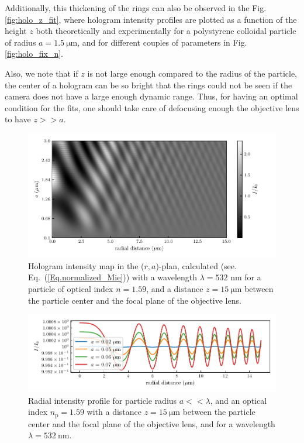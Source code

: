 Additionally, this thickening of the rings can also be observed in the Fig.\ref{fig:holo_z_fit}, where hologram intensity profiles are plotted as a function of the height $z$ both theoretically and experimentally for a polystyrene colloidal particle of radius  $a = 1.5 ~ \mathrm{\mu m} $, and for different couples of parameters in Fig.\ref{fig:holo_fix_n}.

Also, we note that if $z$ is not large enough compared to the radius of the particle, the center of a hologram can be so bright that the rings could not be seen if the camera does not have a large enough dynamic range.  Thus, for having an optimal condition for the fits, one should take care of defocusing enough the objective lens to have $z >> a$.





\begin{figure}
	\centering
	\includegraphics{02_body/chapter2/images/holo_size_exemple/holos_only_r.pdf}
	\caption{Hologram intensity map in the ($r,a$)-plan, calculated (see. Eq.~(\ref{Eq.normalized_Mie})) with a wavelength $\lambda = 532$ nm for a particle of optical index $n = 1.59$, and a distance $z = 15 ~\mathrm{\mu m}$ between the particle center and the focal plane of the objective lens.~\href{https://github.com/eXpensia/Confined-Brownian-Motion/blob/main/02_body/chapter2/images/holo_size_exemple/holosize_variation.ipynb}{\faGithub}}
	\label{fig:holo_onlyr}
\end{figure}

\begin{figure}[H]
	\centering
	\includegraphics{02_body/chapter2/images/holo_size_exemple/smallparticles.pdf}
	\caption{Radial intensity profile for particle radius $a << \lambda$, and an optical index $n_\mathrm{p} = 1.59$ with a distance $z = 15 ~\mathrm{\mu m}$ between the particle center and the focal plane of the objective lens, and for a wavelength $\lambda = 532 ~ \mathrm{nm}$.~\href{https://github.com/eXpensia/Confined-Brownian-Motion/blob/main/02_body/chapter2/images/holo_size_exemple/holosize_variation.ipynb}{\faGithub}}
	\label{fig:small_part_holo}
\end{figure}


